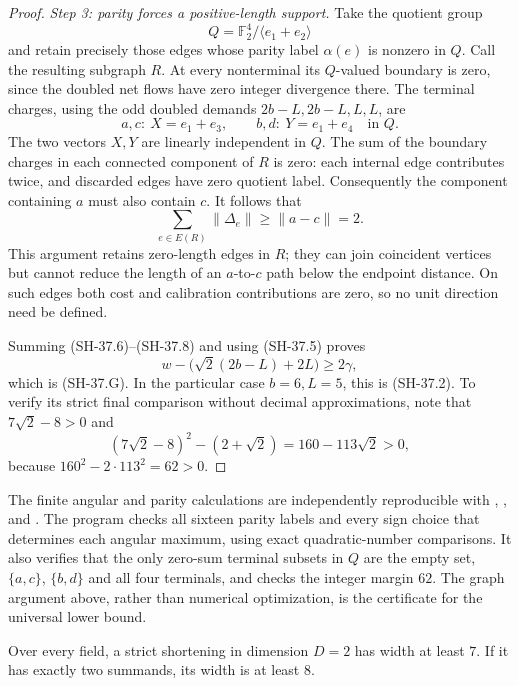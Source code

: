 \begin{proof}
\emph{Step 3: parity forces a positive-length support.}
Take the quotient group
\[
 Q=\mathbb F_2^4/\langle e_1+e_2\rangle
\]
and retain precisely those edges whose parity label
$\alpha(e)$ is nonzero in $Q$.  Call the resulting
subgraph $R$.  At every nonterminal its $Q$-valued
boundary is zero, since the doubled net flows have zero
integer divergence there.  The terminal charges, using
the odd doubled demands $2b-L,2b-L,L,L$, are
\[
 a,c:\ X=e_1+e_3,\qquad
 b,d:\ Y=e_1+e_4
 \quad\text{in }Q.
\]
The two vectors $X,Y$ are linearly independent in $Q$.
The sum of the boundary charges in each connected
component of $R$ is zero: each internal edge contributes
twice, and discarded edges have zero quotient label.
Consequently the component containing $a$ must also
contain $c$.  It follows that
\[
 \sum_{e\in E(R)}\|\Delta_e\|\ge\|a-c\|=2.           \tag{SH-37.8}
\]
This argument retains zero-length edges in $R$; they can
join coincident vertices but cannot reduce the length of
an $a$-to-$c$ path below the endpoint distance.  On such
edges both cost and calibration contributions are zero,
so no unit direction need be defined.

Summing (SH-37.6)--(SH-37.8) and using (SH-37.5) proves
\[
 w-\bigl(\sqrt2(2b-L)+2L\bigr)\ge2\gamma,
\]
which is (SH-37.G).  In the particular case $b=6,L=5$,
this is (SH-37.2).  To verify its strict final comparison
without decimal approximations, note that $7\sqrt2-8>0$
and
\[
 (7\sqrt2-8)^2-(2+\sqrt2)=160-113\sqrt2>0,
\]
because $160^2-2\cdot113^2=62>0$.
\end{proof}

The finite angular and parity calculations are independently
reproducible with ,
, and
.  The program
checks all sixteen parity labels and every sign choice
that determines each angular maximum, using exact
quadratic-number comparisons.  It also verifies that the
only zero-sum terminal subsets in $Q$ are the empty set,
$\{a,c\}$, $\{b,d\}$ and all four terminals, and checks
the integer margin $62$.  The graph argument above,
rather than numerical optimization, is the certificate
for the universal lower bound.

\begin{corollary}
\label{cor:planar-width-six-seven}
Over every field, a strict shortening in dimension $D=2$
has width at least $7$.  If it has exactly two summands,
its width is at least $8$.
\end{corollary}

